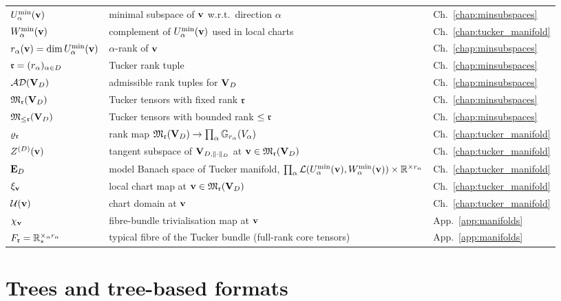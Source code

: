 \begin{tabular}{@{}p{4.5cm}p{7cm}l@{}}
$U^{\min}_{\alpha}(\mathbf{v})$ & minimal subspace of $\mathbf{v}$ w.r.t.\ direction
    $\alpha$ & Ch.~\ref{chap:minsubspaces} \\
$W^{\min}_{\alpha}(\mathbf{v})$ & complement of $U^{\min}_{\alpha}(\mathbf{v})$ used in
    local charts & Ch.~\ref{chap:tucker_manifold} \\
$r_\alpha(\mathbf{v}) = \dim U^{\min}_{\alpha}(\mathbf{v})$ & $\alpha$-rank of $\mathbf{v}$
    & Ch.~\ref{chap:minsubspaces} \\
$\mathfrak{r} = (r_\alpha)_{\alpha \in D}$ & Tucker rank tuple
    & Ch.~\ref{chap:minsubspaces} \\
$\mathcal{AD}(\mathbf{V}_D)$ & admissible rank tuples for $\mathbf{V}_D$
    & Ch.~\ref{chap:minsubspaces} \\
$\mathfrak{M}_{\mathfrak{r}}(\mathbf{V}_D)$ & Tucker tensors with fixed rank $\mathfrak{r}$
    & Ch.~\ref{chap:minsubspaces} \\
$\mathfrak{M}_{\leq\mathfrak{r}}(\mathbf{V}_D)$ & Tucker tensors with bounded rank $\leq \mathfrak{r}$
    & Ch.~\ref{chap:minsubspaces} \\
$\varrho_{\mathfrak{r}}$ & rank map $\mathfrak{M}_{\mathfrak{r}}(\mathbf{V}_D) \to
    \prod_\alpha \mathbb{G}_{r_\alpha}(V_\alpha)$
    & Ch.~\ref{chap:tucker_manifold} \\
$Z^{(D)}(\mathbf{v})$ & tangent subspace of $\mathbf{V}_{D,\|\cdot\|_D}$ at
    $\mathbf{v} \in \mathfrak{M}_{\mathfrak{r}}(\mathbf{V}_D)$ & Ch.~\ref{chap:tucker_manifold} \\
$\mathbf{E}_{D}$ & model Banach space of Tucker manifold,
    $\prod_\alpha \mathcal{L}(U^{\min}_{\alpha}(\mathbf{v}), W^{\min}_{\alpha}(\mathbf{v}))
    \times \mathbb{R}^{\times r_\alpha}$ & Ch.~\ref{chap:tucker_manifold} \\
$\xi_{\mathbf{v}}$ & local chart map at $\mathbf{v} \in \mathfrak{M}_{\mathfrak{r}}(\mathbf{V}_D)$
    & Ch.~\ref{chap:tucker_manifold} \\
$\mathcal{U}(\mathbf{v})$ & chart domain at $\mathbf{v}$
    & Ch.~\ref{chap:tucker_manifold} \\
$\chi_{\mathbf{v}}$ & fibre-bundle trivialisation map at $\mathbf{v}$
    & App.~\ref{app:manifolds} \\
$F_{\mathfrak{r}} = \mathbb{R}^{\times_\alpha r_\alpha}_*$ & typical fibre of the
    Tucker bundle (full-rank core tensors)
    & App.~\ref{app:manifolds} \\
\end{tabular}

\section*{Trees and tree-based formats}

